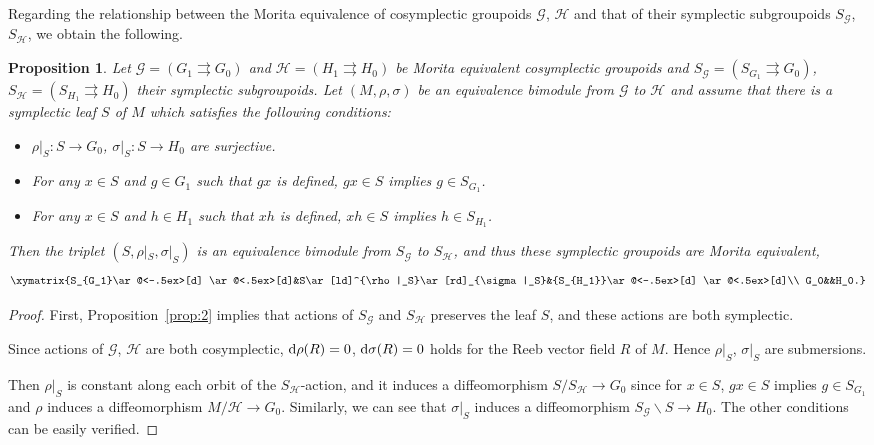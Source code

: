 \documentclass[pdftex]{sigma}
\numberwithin{equation}{section}
\newtheorem{Proposition}[Theorem]{Proposition}
{ \theoremstyle{definition}
\newtheorem{Definition}[Theorem]{Definition}
\newtheorem{Note}[Theorem]{Note}
\newtheorem{Example}[Theorem]{Example}
\newtheorem{Remark}[Theorem]{Remark} }
\begin{document}
Regarding the relationship between the Morita equivalence of cosymplectic groupoids $\mathcal{G}$, $\mathcal{H}$ and that of their symplectic subgroupoids $S_\mathcal{G}$, $S_\mathcal{H}$, we obtain the following.
\begin{Proposition}
 Let $\mathcal{G}=({G}_1\rightrightarrows G_0)$ and $\mathcal{H}=({H}_1\rightrightarrows H_0)$ be Morita equivalent cosymplectic groupoids and $S_\mathcal{G}=(S_{G_1}\rightrightarrows G_0)$, $S_\mathcal{H}=(S_{H_1}\rightrightarrows H_0)$ their symplectic subgroupoids. Let $(M,\rho,\sigma)$ be an equivalence bimodule from $\mathcal{G}$ to $\mathcal{H}$ and assume that there is a symplectic leaf $S$ of $M$ which satisfies the following conditions:
 \begin{itemize}\itemsep=0pt
 \item $\rho|_S\colon S\to G_0$, $ \sigma|_S\colon S\to H_0$ are surjective.
 \item For any $x\in S$ and $g\in G_1$ such that $gx$ is defined, $gx\in S$ implies $g\in S_{G_1}$.
 \item For any $x\in S$ and $h\in H_1$ such that $xh$ is defined, $xh\in S$ implies $h\in S_{H_1}$.
 \end{itemize}
 Then the triplet $(S,\rho|_S,\sigma|_S)$ is an equivalence bimodule from $S_\mathcal{G}$ to $S_\mathcal{H}$, and thus these symplectic groupoids are Morita equivalent,
 \[\xymatrix{S_{G_1}\ar@<-.5ex>[d] \ar@<.5ex>[d]&S\ar[ld]^{\rho|_S}\ar[rd]_{\sigma|_S}&{S_{H_1}}\ar@<-.5ex>[d] \ar@<.5ex>[d]\\
 G_0&&H_0.}\]
\end{Proposition}
\begin{proof}
 First, Proposition~\ref{prop:2} implies that actions of $S_{\mathcal{G}}$ and $S_\mathcal{H}$ preserves the leaf $S$, and these actions are both symplectic.

 Since actions of $\mathcal{G}$, $\mathcal{H}$ are both cosymplectic, ${\rm d}\rho(R)=0$, $ {\rm d}\sigma(R)=0$ holds for the Reeb vector field $R$ of $M$. Hence $\rho|_S$, $\sigma|_S$ are submersions.

 Then $\rho|_S$ is constant along each orbit of the $S_{\mathcal{H}}$-action, and it induces a diffeomorphism $S/S_{\mathcal{H}}\to G_0$ since for $x\in S$, $gx\in S$ implies $g\in S_{G_1}$ and $\rho$ induces a diffeomorphism $M/\mathcal{H}\to G_0$. Similarly, we can see that $\sigma|_S$ induces a diffeomorphism $S_{\mathcal{G}}\backslash S\to H_0$. The other conditions can be easily verified.
\end{proof}
\end{document}

